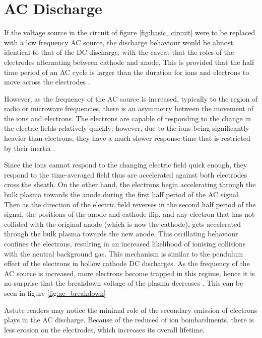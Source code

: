\section{AC Discharge}

If the voltage source in the circuit of figure \ref{fig:basic_circuit} were to be replaced with a low frequency AC source, the discharge behaviour would be almost identical to that of the DC discharge, with the caveat that the roles of the electrodes alternating between cathode and anode. This is provided that the half time period of an AC cycle is larger than the duration for ions and electrons to move across the electrodes \cite{Bogaerts2002}. 

However, as the frequency of the AC source is increased, typically to the region of radio or microwave frequencies, there is an asymmetry between the movement of the ions and electrons. The electrons are capable of responding to the change in the electric fields relatively quickly; however, due to the ions being significantly heavier than electrons, they have a much slower response time that is restricted by their inertia \cite{Chabert2011}.

Since the ions cannot respond to the changing electric field quick enough, they respond to the time-averaged field thus are accelerated against both electrodes cross the sheath. On the other hand, the electrons begin accelerating through the bulk plasma towards the anode during the first half period of the AC signal. Then as the direction of the electric field reverses in the second half period of the signal, the positions of the anode and cathode flip, and any electron that has not collided with the original anode (which is now the cathode), gets accelerated through the bulk plasma towards the new anode. This oscillating behaviour confines the electrons, resulting in an increased likelihood of ionising collisions with the neutral background gas. This mechanism is similar to the pendulum effect of the electrons in hollow cathode DC discharges. As the frequency of the AC source is increased, more electrons become trapped in this regime, hence it is no surprise that the breakdown voltage of the plasma decreases \cite{Chu1992}. This can be seen in figure \ref{fig:ac_breakdown}

Astute readers may notice the minimal role of the secondary emission of electrons plays in the AC discharge. Because of the reduced of ion bombardments, there is less erosion on the electrodes, which increases its overall lifetime. 


